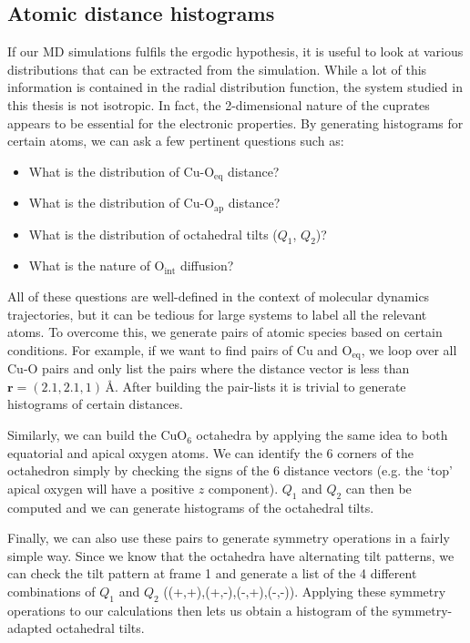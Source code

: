 \subsection{Atomic distance histograms}
If our MD simulations fulfils the ergodic hypothesis, it is useful to look at various distributions that can be extracted from the simulation. While a lot of this information is contained in the radial distribution function, the system studied in this thesis is not isotropic. In fact, the 2-dimensional nature of the cuprates appears to be essential for the electronic properties. By generating histograms for certain atoms, we can ask a few pertinent questions such as:
%
\begin{itemize}
	\item What is the distribution of Cu-O$_\text{eq}$ distance?
	\item What is the distribution of Cu-O$_\text{ap}$ distance?
	\item What is the distribution of octahedral tilts ($Q_1$, $Q_2$)?
	\item What is the nature of O$_\text{int}$ diffusion?
\end{itemize}
%
All of these questions are well-defined in the context of molecular dynamics trajectories, but it can be tedious for large systems to label all the relevant atoms. To overcome this, we generate pairs of atomic species based on certain conditions. For example, if we want to find pairs of Cu and O$_\text{eq}$, we loop over all Cu-O pairs and only list the pairs where the distance vector is less than $\bm{r} = (2.1, 2.1, 1)\,\si{\angstrom}$. After building the pair-lists it is trivial to generate histograms of certain distances.

Similarly, we can build the CuO$_6$ octahedra by applying the same idea to both equatorial and apical oxygen atoms. We can identify the 6 corners of the octahedron simply by checking the signs of the 6 distance vectors (e.g. the `top' apical oxygen will have a positive $z$ component). $Q_1$ and $Q_2$ can then be computed and we can generate histograms of the octahedral tilts.

Finally, we can also use these pairs to generate symmetry operations in a fairly simple way. Since we know that the octahedra have alternating tilt patterns, we can check the tilt pattern at frame 1 and generate a list of the 4 different combinations of $Q_1$ and $Q_2$ ((+,+),(+,-),(-,+),(-,-)). Applying these symmetry operations to our calculations then lets us obtain a histogram of the symmetry-adapted octahedral tilts.

